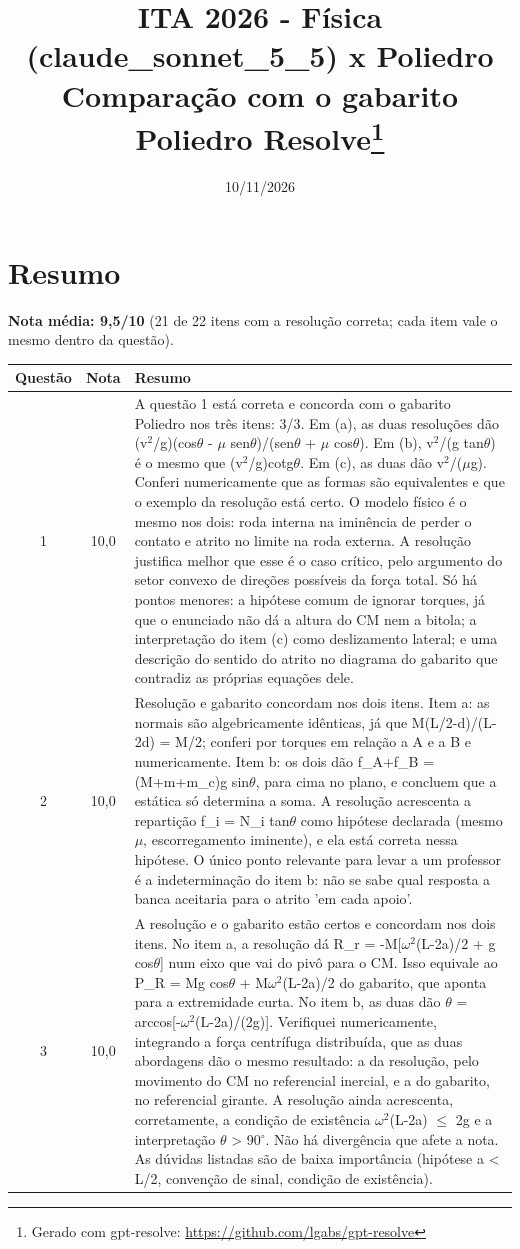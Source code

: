 \documentclass{article}%
\title{ITA 2026 {-} Física (claude\_sonnet\_5\_5) x Poliedro\\[4pt]\large Comparação com o gabarito Poliedro Resolve\thanks{Gerado com gpt-resolve: \url{https://github.com/lgabs/gpt-resolve}}}%
\date{10/11/2026}%
\begin{document}
%
\normalsize%
\maketitle%
\section*{Resumo}\textbf{Nota média: 9,5/10} (21 de 22 itens com a resolução correta; cada item vale o mesmo dentro da questão).\par\medskip%
\begin{longtable}{@{}c c p{}@{}}\toprule Questão & Nota & Resumo \\ \midrule
1 & 10,0 & A questão 1 está correta e concorda com o gabarito Poliedro nos três itens: 3/3. Em (a), as duas resoluções dão (v$^2$/g)(cos$\theta$ - $\mu$ sen$\theta$)/(sen$\theta$ + $\mu$ cos$\theta$). Em (b), v$^2$/(g tan$\theta$) é o mesmo que (v$^2$/g)cotg$\theta$. Em (c), as duas dão v$^2$/($\mu$g). Conferi numericamente que as formas são equivalentes e que o exemplo da resolução está certo. O modelo físico é o mesmo nos dois: roda interna na iminência de perder o contato e atrito no limite na roda externa. A resolução justifica melhor que esse é o caso crítico, pelo argumento do setor convexo de direções possíveis da força total. Só há pontos menores: a hipótese comum de ignorar torques, já que o enunciado não dá a altura do CM nem a bitola; a interpretação do item (c) como deslizamento lateral; e uma descrição do sentido do atrito no diagrama do gabarito que contradiz as próprias equações dele. \\
2 & 10,0 & Resolução e gabarito concordam nos dois itens. Item a: as normais são algebricamente idênticas, já que M(L/2-d)/(L-2d) = M/2; conferi por torques em relação a A e a B e numericamente. Item b: os dois dão f\_A+f\_B = (M+m+m\_c)g sin$\theta$, para cima no plano, e concluem que a estática só determina a soma. A resolução acrescenta a repartição f\_i = N\_i tan$\theta$ como hipótese declarada (mesmo $\mu$, escorregamento iminente), e ela está correta nessa hipótese. O único ponto relevante para levar a um professor é a indeterminação do item b: não se sabe qual resposta a banca aceitaria para o atrito 'em cada apoio'. \\
3 & 10,0 & A resolução e o gabarito estão certos e concordam nos dois itens. No item a, a resolução dá R\_r = -M{[}$\omega$$^2$(L-2a)/2 + g cos$\theta${]} num eixo que vai do pivô para o CM. Isso equivale ao P\_R = Mg cos$\theta$ + M$\omega$$^2$(L-2a)/2 do gabarito, que aponta para a extremidade curta. No item b, as duas dão $\theta$ = arccos{[}-$\omega$$^2$(L-2a)/(2g){]}. Verifiquei numericamente, integrando a força centrífuga distribuída, que as duas abordagens dão o mesmo resultado: a da resolução, pelo movimento do CM no referencial inercial, e a do gabarito, no referencial girante. A resolução ainda acrescenta, corretamente, a condição de existência $\omega$$^2$(L-2a) $\leq$ 2g e a interpretação $\theta$ > 90$^\circ$. Não há divergência que afete a nota. As dúvidas listadas são de baixa importância (hipótese a < L/2, convenção de sinal, condição de existência). \\

\end{longtable}
\end{document}

